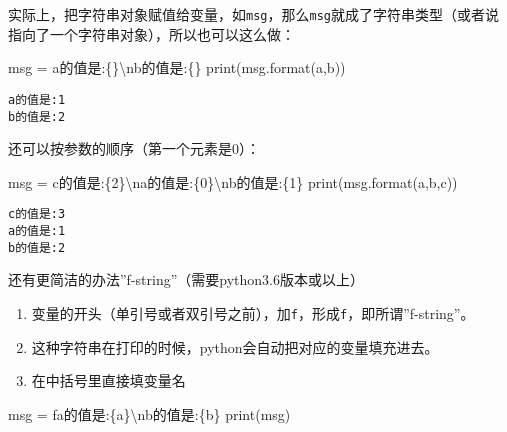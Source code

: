 \documentclass[
  letterpaper,
  DIV=11,
  numbers=noendperiod]{scrreprt}
\newenvironment{Shaded}{\begin{snugshade}}{\end{snugshade}}
\newcommand{\BuiltInTok}[1]{\textcolor[rgb]{0.00,0.23,0.31}{#1}}
\newcommand{\CharTok}[1]{\textcolor[rgb]{0.13,0.47,0.30}{#1}}
\newcommand{\NormalTok}[1]{\textcolor[rgb]{0.00,0.23,0.31}{#1}}
\newcommand{\OperatorTok}[1]{\textcolor[rgb]{0.37,0.37,0.37}{#1}}
\newcommand{\SpecialCharTok}[1]{\textcolor[rgb]{0.37,0.37,0.37}{#1}}
\newcommand{\SpecialStringTok}[1]{\textcolor[rgb]{0.13,0.47,0.30}{#1}}
\newcommand{\StringTok}[1]{\textcolor[rgb]{0.13,0.47,0.30}{#1}}
\providecommand{\tightlist}{%
  \setlength{\itemsep}{0pt}\setlength{\parskip}{0pt}}\usepackage{longtable,booktabs,array}
\begin{document}
实际上，把字符串对象赋值给变量，如\texttt{msg}，那么\texttt{msg}就成了字符串类型（或者说指向了一个字符串对象），所以也可以这么做：

\begin{Shaded}
\begin{Highlighting}[]
\NormalTok{msg }\OperatorTok{=} \StringTok{\textquotesingle{}a的值是:}\SpecialCharTok{\{\}}\CharTok{\textbackslash{}n}\StringTok{b的值是:}\SpecialCharTok{\{\}}\StringTok{\textquotesingle{}}
\BuiltInTok{print}\NormalTok{(msg.}\BuiltInTok{format}\NormalTok{(a,b))}
\end{Highlighting}
\end{Shaded}

\begin{verbatim}
a的值是:1
b的值是:2
\end{verbatim}

还可以按参数的顺序（第一个元素是0）：

\begin{Shaded}
\begin{Highlighting}[]
\NormalTok{msg }\OperatorTok{=} \StringTok{\textquotesingle{}c的值是:}\SpecialCharTok{\{2\}}\CharTok{\textbackslash{}n}\StringTok{a的值是:}\SpecialCharTok{\{0\}}\CharTok{\textbackslash{}n}\StringTok{b的值是:}\SpecialCharTok{\{1\}}\StringTok{\textquotesingle{}}
\BuiltInTok{print}\NormalTok{(msg.}\BuiltInTok{format}\NormalTok{(a,b,c))}
\end{Highlighting}
\end{Shaded}

\begin{verbatim}
c的值是:3
a的值是:1
b的值是:2
\end{verbatim}

还有更简洁的办法''f-string''（需要python3.6版本或以上）

\begin{enumerate}
\def\labelenumi{\arabic{enumi}.}
\tightlist
\item
  变量的开头（单引号或者双引号之前），加\texttt{f}，形成\texttt{f\textquotesingle{}\textquotesingle{}}，即所谓''f-string''。
\item
  这种字符串在打印的时候，python会自动把对应的变量填充进去。
\item
  在中括号里直接填变量名
\end{enumerate}

\begin{Shaded}
\begin{Highlighting}[]
\NormalTok{msg }\OperatorTok{=} \SpecialStringTok{f\textquotesingle{}a的值是:}\SpecialCharTok{\{}\NormalTok{a}\SpecialCharTok{\}}\CharTok{\textbackslash{}n}\SpecialStringTok{b的值是:}\SpecialCharTok{\{}\NormalTok{b}\SpecialCharTok{\}}\SpecialStringTok{\textquotesingle{}}
\BuiltInTok{print}\NormalTok{(msg)}
\end{Highlighting}
\end{Shaded}
\end{document}
